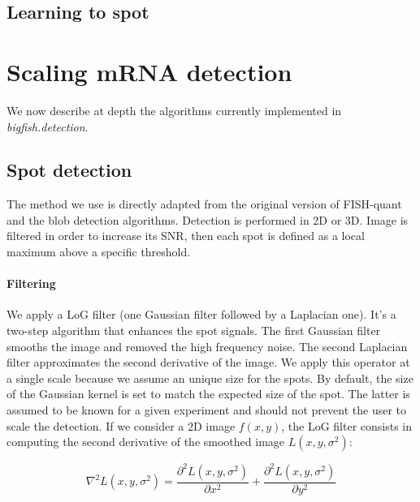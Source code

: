 
\subsection{Learning to spot} \label{subsec:detection_dl}


\section{Scaling \ac{mRNA} detection} \label{sec:method}

We now describe at depth the algorithms currently implemented in \emph{bigfish.detection}.

\subsection{Spot detection} \label{subsec:spot_detection}

The method we use is directly adapted from the original version of FISH-quant\cite{mueller_fish-quant_2013} and the blob detection algorithms\cite{walt_scikit-image_2014}.
Detection is performed in 2D or 3D. Image is filtered in order to increase its \ac{SNR}, then each spot is defined as a local maximum above a specific threshold.

\paragraph{Filtering}

We apply a \ac{LoG} filter (one Gaussian filter followed by a Laplacian one).
It's a two-step algorithm that enhances the spot signals.
The first Gaussian filter smooths the image and removed the high frequency noise.
The second Laplacian filter approximates the second derivative of the image.
We apply this operator at a single scale because we assume an unique size for the spots.
By default, the size of the Gaussian kernel is set to match the expected size of the spot.
The latter is assumed to be known for a given experiment and should not prevent the user to scale the detection.
If we consider a 2D image $f(x,y)$, the \ac{LoG} filter consists in computing the second derivative of the smoothed image $L(x, y, \sigma^2)$:

\begin{equation}
	\nabla^{2}L(x, y, \sigma^2) = \frac{\partial^{2}L(x, y, \sigma^2)}{\partial x^2} + \frac{\partial^{2}L(x, y, \sigma^2)}{\partial y^2}
\end{equation}

